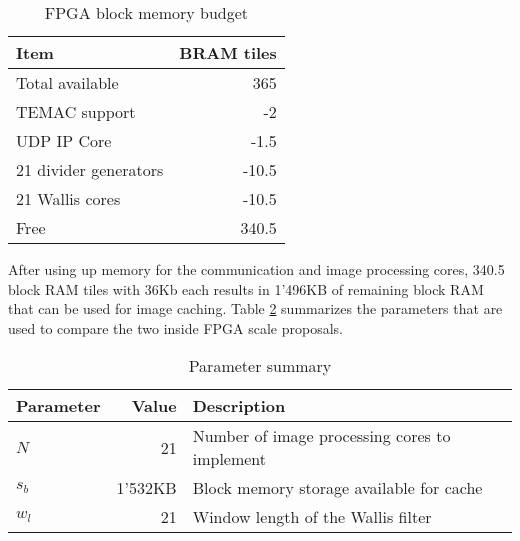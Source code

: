 \begin{table}[h!]
    \centering
    \begin{tabular}{l r}
        \toprule
        Item & BRAM tiles \\
        \midrule
        Total available & 365 \\
        TEMAC support & -2 \\
        UDP IP Core & -1.5 \\
        21 divider generators & -10.5 \\
        21 Wallis cores & -10.5 \\
        \midrule
        Free & 340.5\\
        \bottomrule
    \end{tabular}
    \caption{FPGA block memory budget}
    \label{tab:membudget}
\end{table}

After using up memory for the communication and image processing cores, 340.5
block RAM tiles with 36Kb each results in 1'496KB of remaining block RAM that
can be used for image caching. Table \ref{tab:parsum} summarizes the
parameters that are used to compare the two inside FPGA scale proposals.

\begin{table}[h!]
    \centering
    \begin{tabular}{l r l}
        \toprule
        Parameter & Value & Description\\
        \midrule
        $N$ & 21 & Number of image processing cores to implement \\
        $s_b$ & 1'532KB & Block memory storage available for cache \\
        $w_l$ & 21 & Window length of the Wallis filter \\
        \bottomrule
    \end{tabular}
    \caption{Parameter summary}
    \label{tab:parsum}
\end{table}

